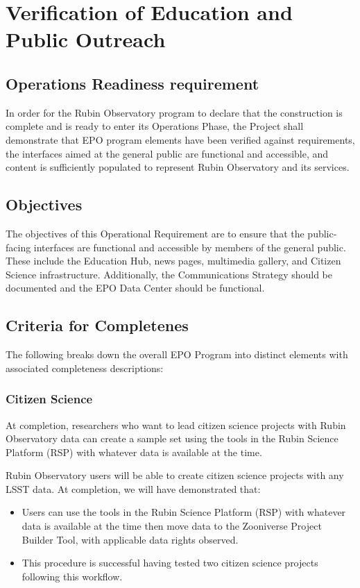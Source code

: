 \section{Verification of Education and Public Outreach}  \label{sec:community}

\subsection{Operations Readiness requirement}

In order for the Rubin Observatory program to declare that the construction is complete and is ready to enter its Operations Phase, the Project shall demonstrate that EPO program elements have been verified against requirements, the interfaces aimed at the general public are functional and accessible, and content is sufficiently populated to represent Rubin Observatory and its services.

\subsection{Objectives}

The objectives of this Operational Requirement are to ensure that the public-facing interfaces are functional and accessible by members of the general public. These include the Education Hub, news pages, multimedia gallery, and Citizen Science infrastructure. Additionally, the Communications Strategy should be documented and the EPO Data Center should be functional.

\subsection{Criteria for Completenes}

The following breaks down the overall EPO Program into distinct elements with associated completeness descriptions:

\subsubsection{Citizen Science}

At completion, researchers who want to lead citizen science projects with Rubin Observatory data can create a sample set using the tools in the Rubin Science Platform (RSP) with whatever data is available at the time.

Rubin Observatory users will be able to create citizen science projects with any LSST data.  At completion, we will have demonstrated that:
\begin{itemize}
	\item Users can use the tools in the Rubin Science Platform (RSP) with whatever data is available at the time then move data to the Zooniverse Project Builder Tool, with applicable data rights observed.
	\item This procedure is successful having tested two citizen science projects following this workflow.
\end{itemize}

